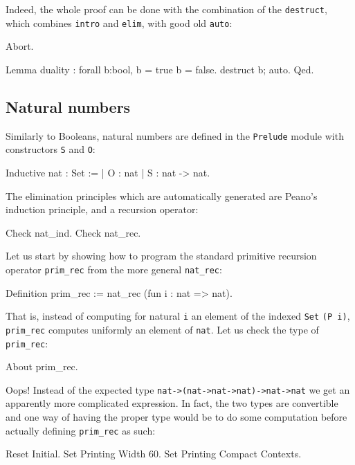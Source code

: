 \documentclass[11pt,a4paper]{book}
\begin{document}
Indeed, the whole proof can be done with the combination of the
 \verb:destruct:, which combines \verb:intro: and \verb:elim:,
with good old \verb:auto::
\begin{coq_eval}
Abort.
\end{coq_eval}
\begin{coq_example}
Lemma duality : forall b:bool, b = true \/ b = false.
destruct b; auto.
Qed.
\end{coq_example}

\subsection{Natural numbers}

Similarly to Booleans, natural numbers are defined in the \verb:Prelude:
module with constructors \verb:S: and \verb:O::
\begin{coq_example}
Inductive nat : Set :=
  | O : nat
  | S : nat -> nat.
\end{coq_example}

The elimination principles which are automatically generated are Peano's
induction principle, and a recursion operator:
\begin{coq_example}
Check nat_ind.
Check nat_rec.
\end{coq_example}

Let us start by showing how to program the standard primitive recursion
operator \verb:prim_rec: from the more general \verb:nat_rec::
\begin{coq_example}
Definition prim_rec := nat_rec (fun i : nat => nat).
\end{coq_example}

That is, instead of computing for natural \verb:i: an element of the indexed
\verb:Set: \verb:(P i):, \verb:prim_rec: computes uniformly an element of
\verb:nat:. Let us check the type of \verb:prim_rec::
\begin{coq_example}
About prim_rec.
\end{coq_example}

Oops! Instead of the expected type \verb+nat->(nat->nat->nat)->nat->nat+ we
get an apparently more complicated expression.
In fact, the two types are convertible and one way of having the proper
type would be to do some computation before actually defining \verb:prim_rec:
as such:

\begin{coq_eval}
Reset Initial.
Set Printing Width 60.
Set Printing Compact Contexts.
\end{coq_eval}
\end{document}

